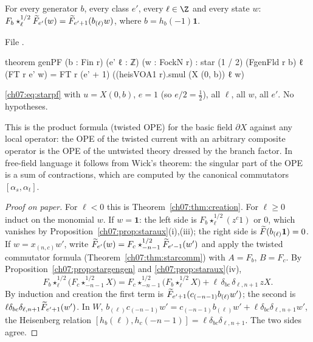 \begin{theorem}\label{ch07:thm:genPF}
For every generator $b$, every class $e'$, every $\ell\in\Z$ and every state $w$:
$F_b\star^{1/2}_\ell\widetilde{F}_{e'}(w) = \widetilde{F}_{e'+1}(b_{(\ell)}w)$, where $b = h_b(-1)\mathbf 1$.
\end{theorem}

\noindent File .
\begin{leancode}
theorem genPF (b : Fin r) (e' ℓ : ℤ) (w : FockN r) :
    star (1 / 2) (FgenFld r b) ℓ (FT r e' w)
      = FT r (e' + 1) ((heisVOA1 r).smul (X (0, b)) ℓ w)
\end{leancode}

\begin{dictionary}
\eqref{ch07:eq:starpf} with $u = X(0,b)$, $e=1$ (so $e/2 = \frac12$), all $\ell$, all $w$, all
$e'$. No hypotheses.
\end{dictionary}

\begin{physics}
This is the product formula (twisted OPE) for the basic field $\partial X$ against any local operator: the OPE of the twisted current with an arbitrary composite operator is the OPE of the untwisted theory dressed by the branch factor. In free-field language it follows from Wick's theorem: the singular part of the OPE is a sum of contractions, which are computed by the canonical commutators $[\alpha_s,\alpha_t]$.
\end{physics}

\begin{proof}[Proof on paper]
For $\ell<0$ this is Theorem~\ref{ch07:thm:creation}. For $\ell\ge0$ induct on the monomial $w$.
If $w = \mathbf 1$: the left side is $F_b\star^{1/2}_\ell(z^c1)$ or $0$, which vanishes by
Proposition~\ref{ch07:prop:staraux}(i),(iii); the right side is $\widetilde{F}(b_{(\ell)}\mathbf 1) =
0$. If $w = x_{(n,c)}w'$, write $\widetilde{F}_{e'}(w) = F_c\star^{1/2}_{-n-1}\widetilde{F}_{e'-1}(w')$
and apply the twisted commutator formula (Theorem~\ref{ch07:thm:starcomm}) with $A = F_b$,
$B = F_c$. By Proposition~\ref{ch07:prop:stargengen} and \ref{ch07:prop:staraux}(iv),
\begin{equation*}
  F_b\star^{1/2}_\ell\bigl(F_c\star^{1/2}_{-n-1}X\bigr) = F_c\star^{1/2}_{-n-1}\bigl(F_b
  \star^{1/2}_\ell X\bigr) + \ell\,\delta_{bc}\,\delta_{\ell,n+1}\,zX.
\end{equation*}
By induction and creation the first term is $\widetilde{F}_{e'+1}(c_{(-n-1)}b_{(\ell)}w')$; the second
is $\ell\delta_{bc}\delta_{\ell,n+1}\widetilde{F}_{e'+1}(w')$. In $W$,
$b_{(\ell)}c_{(-n-1)}w' = c_{(-n-1)}b_{(\ell)}w' + \ell\delta_{bc}\delta_{\ell,n+1}w'$, the
Heisenberg relation $[h_b(\ell),h_c(-n-1)] = \ell\delta_{bc}\delta_{\ell,n+1}$. The two sides agree.
\end{proof}

